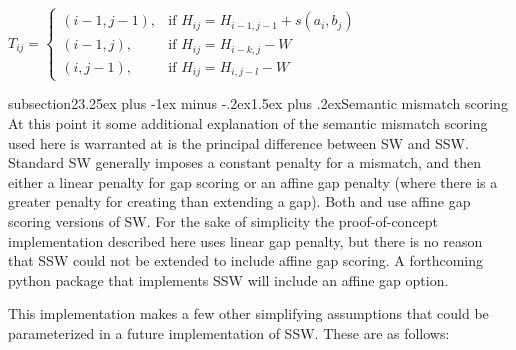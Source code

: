 \documentclass[11pt]{article}
\makeatletter
\renewcommand{\subsection}{\@startsection 
{subsection}{2}{\z@}{3.25ex plus -1ex minus -.2ex}{1.5ex plus .2ex}{\normalsize\bf}}
\makeatother
\begin{document}
\begin{flushleft}
\begin{algorithm}[t]
{\vspace{10pt}

 \hspace{1em} ${\displaystyle T_{ij}={\begin{cases}    (i-1,j-1), & \text{if } H_{ij} = H_{i-1,j-1}+s(a_{i},b_{j}) \\
    (i-1,j), & \text{if } H_{ij} = H_{i-k,j}-W \\
    (i,j-1), & \text{if } H_{ij} = H_{i,j-l}-W
    \end{cases}}}$
}
\vspace{10pt}



\caption{Semantic Smith Waterman \protect\footnotemark}
\label{alg:one}
\end{algorithm}



\subsection{Semantic mismatch scoring}
At this point it some additional explanation of the semantic mismatch scoring used here is warranted at is the principal difference between SW and SSW. Standard SW generally imposes a constant penalty for a mismatch, and then either a linear penalty for gap scoring or an affine gap penalty (where there is a greater penalty for creating than extending a gap). Both \cite{wilkerson2015tracing} and \cite{Fridolin2017text} use affine gap scoring versions of SW. For the sake of simplicity the proof-of-concept implementation described here uses linear gap penalty, but there is no reason that SSW could not be extended to include affine gap scoring. A forthcoming python package that implements SSW will include an affine gap option.

This implementation makes a few other simplifying assumptions that could be parameterized in a future implementation of SSW. These are as follows:


\end{flushleft}
\end{document}
